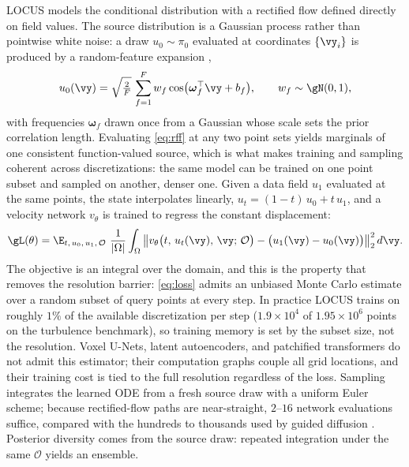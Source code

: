\documentclass{article} %
\newcommand{\model}{LOCUS}
\begin{document}
\model{} models the conditional distribution with a rectified flow \citep{liu2023flow,lipman2023flow,albergo2023building} defined directly on field values. The source distribution is a Gaussian process rather than pointwise white noise: a draw $u_0\sim\pi_0$ evaluated at coordinates $\{\vy_i\}$ is produced by a random-feature expansion \citep{rahimi2007random},
\begin{equation}
u_0(\vy) = \sqrt{\tfrac{2}{F}}\,\sum_{f=1}^{F} w_f \cos\!\big(\boldsymbol{\omega}_f^{\top}\vy+b_f\big),\qquad w_f\sim\gN(0,1),
\label{eq:rff}
\end{equation}
with frequencies $\boldsymbol{\omega}_f$ drawn once from a Gaussian whose scale sets the prior correlation length. Evaluating \eqref{eq:rff} at any two point sets yields marginals of one consistent function-valued source, which is what makes training and sampling coherent across discretizations: the same model can be trained on one point subset and sampled on another, denser one. Given a data field $u_1$ evaluated at the same points, the state interpolates linearly, $u_t=(1-t)\,u_0+t\,u_1$, and a velocity network $v_\theta$ is trained to regress the constant displacement:
\begin{equation}
\gL(\theta)=\E_{t,\,u_0,\,u_1,\,\mathcal{O}}\ \frac{1}{|\Omega|}\int_{\Omega}\big\| v_\theta\big(t,\,u_t(\vy),\,\vy;\,\mathcal{O}\big)-\big(u_1(\vy)-u_0(\vy)\big)\big\|_2^2\, d\vy .
\label{eq:loss}
\end{equation}
The objective is an integral over the domain, and this is the property that removes the resolution barrier: \eqref{eq:loss} admits an unbiased Monte Carlo estimate over a random subset of query points at every step. In practice \model{} trains on roughly $1\%$ of the available discretization per step ($1.9\times10^{4}$ of $1.95\times10^{6}$ points on the turbulence benchmark), so training memory is set by the subset size, not the resolution. Voxel U-Nets, latent autoencoders, and patchified transformers do not admit this estimator; their computation graphs couple all grid locations, and their training cost is tied to the full resolution regardless of the loss. Sampling integrates the learned ODE from a fresh source draw with a uniform Euler scheme; because rectified-flow paths are near-straight, $2$--$16$ network evaluations suffice, compared with the hundreds to thousands used by guided diffusion \citep{li2024s3gm,huang2024diffusionpde}. Posterior diversity comes from the source draw: repeated integration under the same $\mathcal{O}$ yields an ensemble.
\end{document}
